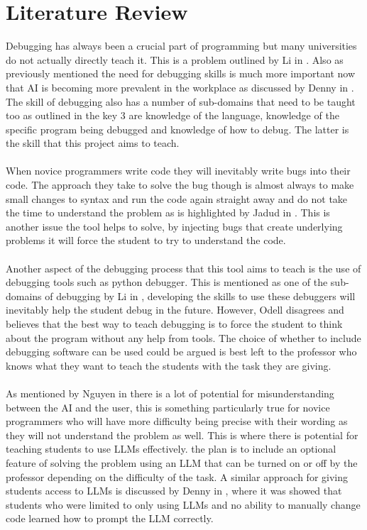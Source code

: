 \documentclass[12pt]{extarticle}
\begin{document}
\section{Literature Review}

Debugging has always been a crucial part of programming but many universities do not actually directly teach it. This is a problem outlined by Li in \cite{li2019}. Also as previously mentioned the need for debugging skills is much more important now that AI is becoming more prevalent in the workplace as discussed by Denny in \cite{denny2024}. The skill of debugging also has a number of sub-domains that need to be taught too as outlined in \cite{li2019} the key 3 are knowledge of the language, knowledge of the specific program being debugged and knowledge of how to debug. The latter is the skill that this project aims to teach.\\
\\
When novice programmers write code they will inevitably write bugs into their code. The approach they take to solve the bug though is almost always to make small changes to syntax and run the code again straight away and do not take the time to understand the problem as is highlighted by Jadud in \cite{jadud2006}. This is another issue the tool helps to solve, by injecting bugs that create underlying problems it will force the student to try to understand the code.\\
\\
Another aspect of the debugging process that this tool aims to teach is the use of debugging tools such as python debugger. This is mentioned as one of the sub-domains of debugging by Li in \cite{li2019}, developing the skills to use these debuggers will inevitably help the student debug in the future. However, Odell \cite{odell2017} disagrees and believes that the best way to teach debugging is to force the student to think about the program without any help from tools. The choice of whether to include debugging software can be used could be argued is best left to the professor who knows what they want to teach the students with the task they are giving.\\
\\
As mentioned by Nguyen in \cite{nguyen2024} there is a lot of potential for misunderstanding between the AI and the user, this is something particularly true for novice programmers who will have more difficulty being precise with their wording as they will not understand the problem as well. This is where there is potential for teaching students to use LLMs effectively. the plan is to include an optional feature of solving the problem using an LLM that can be turned on or off by the professor depending on the difficulty of the task. A similar approach for giving students access to LLMs is discussed by Denny in \cite{denny2023}, where it was showed that students who were limited to only using LLMs and no ability to manually change code learned how to prompt the LLM correctly.\\
\end{document}
